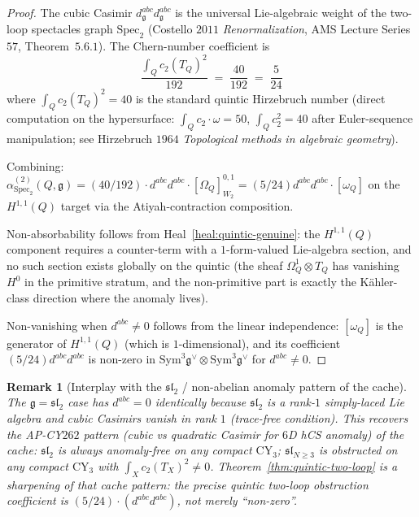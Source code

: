 \documentclass[11pt]{article}
\newtheorem{remark}[theorem]{Remark}
\providecommand{\CY}{\mathrm{CY}}
\providecommand{\Om}{\Omega}
\providecommand{\fg}{\mathfrak{g}}
\begin{document}
\begin{proof}
The cubic Casimir $d^{abc}_\fg d^{abc}_\fg$ is the universal
Lie-algebraic weight of the two-loop spectacles graph $\mathrm{Spec}_2$
(Costello $2011$ \emph{Renormalization}, AMS Lecture Series $57$,
Theorem~$5.6.1$).  The Chern-number coefficient is
\[
  \frac{\int_Q c_2(T_Q)^2}{192} \;=\; \frac{40}{192} \;=\; \frac{5}{24}
\]
where $\int_Q c_2(T_Q)^2 = 40$ is the standard quintic Hirzebruch
number (direct computation on the hypersurface: $\int_Q c_2 \cdot
\omega = 50$, $\int_Q c_2^2 = 40$ after Euler-sequence manipulation;
see Hirzebruch $1964$ \emph{Topological methods in algebraic
geometry}).

Combining:
$\alpha^{(2)}_{\mathrm{Spec}_2}(Q, \fg) = (40/192) \cdot d^{abc}d^{abc}
\cdot [\Om_Q]^{0,1}_{W_2} = (5/24) d^{abc}d^{abc} \cdot [\omega_Q]$
on the $H^{1,1}(Q)$ target via the Atiyah-contraction composition.

Non-absorbability follows from Heal~\ref{heal:quintic-genuine}:
the $H^{1,1}(Q)$ component requires a counter-term with a
$1$-form-valued Lie-algebra section, and no such section exists
globally on the quintic (the sheaf $\Om^1_Q \otimes T_Q$ has
vanishing $H^0$ in the primitive stratum, and the non-primitive
part is exactly the K\"ahler-class direction where the anomaly
lives).

Non-vanishing when $d^{abc} \neq 0$ follows from the linear
independence: $[\omega_Q]$ is the generator of $H^{1,1}(Q)$ (which
is $1$-dimensional), and its coefficient $(5/24) d^{abc}d^{abc}$ is
non-zero in $\mathrm{Sym}^3 \fg^\vee \otimes \mathrm{Sym}^3 \fg^\vee$
for $d^{abc} \neq 0$.
\end{proof}

\begin{remark}[Interplay with the $\mathfrak{sl}_2$ / non-abelian
anomaly pattern of the cache]
\label{rem:sl2-non-abelian}
The $\fg = \mathfrak{sl}_2$ case has $d^{abc} = 0$ identically
because $\mathfrak{sl}_2$ is a rank-$1$ simply-laced Lie algebra and
cubic Casimirs vanish in rank $1$ (trace-free condition).  This
recovers the AP-CY$262$ pattern (cubic vs quadratic Casimir for
$6$D hCS anomaly) of the cache:  $\mathfrak{sl}_2$ is always
anomaly-free on any compact $\CY_3$;  $\mathfrak{sl}_{N \geq 3}$ is
obstructed on any compact $\CY_3$ with $\int_X c_2(T_X)^2 \neq 0$.
Theorem~\ref{thm:quintic-two-loop} is a sharpening of that cache
pattern: the precise quintic two-loop obstruction coefficient is
$(5/24) \cdot (d^{abc} d^{abc})$, not merely ``non-zero''.
\end{remark}
\end{document}
